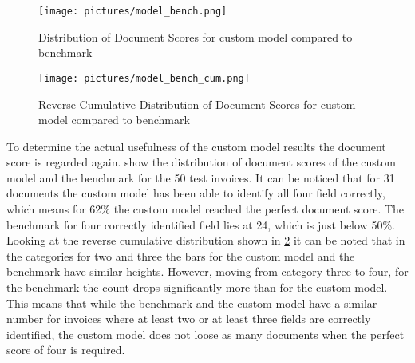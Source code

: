 \begin{figure}[!ht]
    \centering 
    \texttt{[image: pictures/model\_bench.png]}
    \caption{Distribution of Document Scores for custom model compared to benchmark}
    \label{pic:model_bench}    %
\end{figure}
\begin{figure}[!ht]
    \centering 
    \texttt{[image: pictures/model\_bench\_cum.png]}
    \caption{Reverse Cumulative Distribution of Document Scores for custom model compared to benchmark}
    \label{pic:model_bench_cum}    %
\end{figure}

To determine the actual usefulness of the custom model results the document score is regarded again.
 show the distribution of document scores of the custom model and the benchmark for the 50 test invoices. 
It can be noticed that for 31 documents the custom model has been able to identify all four field correctly, which means for 62\% the custom model reached the perfect document score.
The benchmark for four correctly identified field lies at 24, which is just below 50\%.
Looking at the reverse cumulative distribution shown in \cref{pic:model_bench_cum} it can be noted that
in the categories for two and three the bars for the custom model and the benchmark have similar heights.
However, moving from category three to four, for the benchmark the count drops significantly more than for the custom model.
This means that while the benchmark and the custom model have a similar number for invoices where at least two or at least three fields are correctly identified,
the custom model does not loose as many documents when the perfect score of four is required.